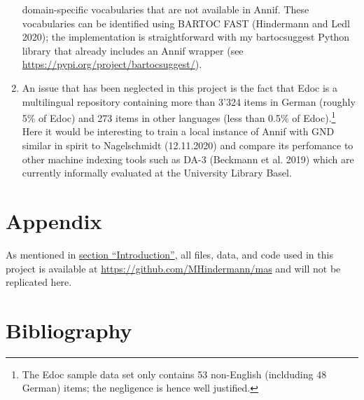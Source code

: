 \begin{enumerate}
  domain-specific vocabularies that are not available in Annif. These
  vocabularies can be identified using BARTOC FAST (Hindermann and Ledl
  2020); the implementation is straightforward with my bartocsuggest
  Python library that already includes an Annif wrapper (see
  \url{https://pypi.org/project/bartocsuggest/}).
\item
  An issue that has been neglected in this project is the fact that Edoc
  is a multilingual repository containing more than 3'324 items in
  German (roughly 5\% of Edoc) and 273 items in other languages (less
  than 0.5\% of Edoc).\footnote{The Edoc sample data set only contains
    53 non-English (inclduding 48 German) items; the negligence is hence
    well justified.} Here it would be interesting to train a local
  instance of Annif with GND similar in spirit to Nagelschmidt
  (12.11.2020) and compare its perfomance to other machine indexing
  tools such as DA-3 (Beckmann et al. 2019) which are currently
  informally evaluated at the University Library Basel.
\end{enumerate}

\hypertarget{appendix}{%
\section{Appendix}\label{appendix}}

As mentioned in \protect\hyperlink{introduction}{section
``Introduction''}, all files, data, and code used in this project is
available at \url{https://github.com/MHindermann/mas} and will not be
replicated here.

\hypertarget{bibliography}{%
\section{Bibliography}\label{bibliography}}

